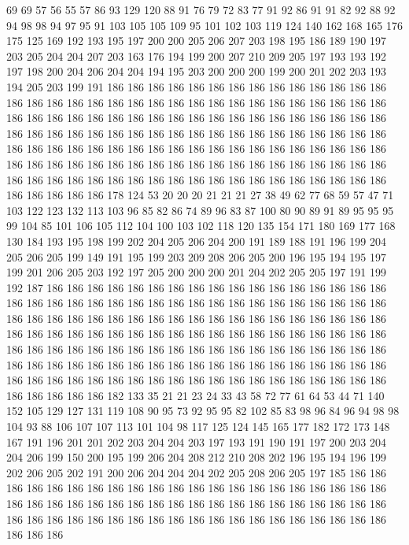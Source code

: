 69 69 57 56 55 57 86 93 129 120 88 91 76 79 72 83 77 91 92 86
91 91 82 92 88 92 94 98 98 94 97 95 91 103 105 105 109 95 101 102
103 119 124 140 162 168 165 176 175 125 169 192 193 195 197 200 200 205 206 207
203 198 195 186 189 190 197 203 205 204 204 207 203 163 176 194 199 200 207 210
209 205 197 193 193 192 197 198 200 204 206 204 204 194 195 203 200 200 200 199
200 201 202 203 193 194 205 203 199 191 186 186 186 186 186 186 186 186 186 186
186 186 186 186 186 186 186 186 186 186 186 186 186 186 186 186 186 186 186 186
186 186 186 186 186 186 186 186 186 186 186 186 186 186 186 186 186 186 186 186
186 186 186 186 186 186 186 186 186 186 186 186 186 186 186 186 186 186 186 186
186 186 186 186 186 186 186 186 186 186 186 186 186 186 186 186 186 186 186 186
186 186 186 186 186 186 186 186 186 186 186 186 186 186 186 186 186 186 186 186
186 186 186 186 186 186 186 186 186 186 186 186 186 186 186 186 186 186 186 186
186 186 186 178 124 53 20 20 20 21 21 21 27 38 49 62 77 68 59 57
47 71 103 122 123 132 113 103 96 85 82 86 74 89 96 83 87 100 80 90
89 91 89 95 95 95 99 104 85 101 106 105 112 104 100 103 102 118 120 135
154 171 180 169 177 168 130 184 193 195 198 199 202 204 205 206 204 200 191 189
188 191 196 199 204 205 206 205 199 149 191 195 199 203 209 208 206 205 200 196
195 194 195 197 199 201 206 205 203 192 197 205 200 200 200 201 204 202 205 205
197 191 199 192 187 186 186 186 186 186 186 186 186 186 186 186 186 186 186 186
186 186 186 186 186 186 186 186 186 186 186 186 186 186 186 186 186 186 186 186
186 186 186 186 186 186 186 186 186 186 186 186 186 186 186 186 186 186 186 186
186 186 186 186 186 186 186 186 186 186 186 186 186 186 186 186 186 186 186 186
186 186 186 186 186 186 186 186 186 186 186 186 186 186 186 186 186 186 186 186
186 186 186 186 186 186 186 186 186 186 186 186 186 186 186 186 186 186 186 186
186 186 186 186 186 186 186 186 186 186 186 186 186 186 186 186 186 186 186 186
186 182 133 35 21 21 23 24 33 43 58 72 77 61 64 53 44 71 140 152
105 129 127 131 119 108 90 95 73 92 95 95 82 102 85 83 98 96 84 96
94 98 98 104 93 88 106 107 107 113 101 104 98 117 125 124 145 165 177 182
172 173 148 167 191 196 201 201 202 203 204 204 203 197 193 191 190 191 197 200
203 204 204 206 199 150 200 195 199 206 204 208 212 210 208 202 196 195 194 196
199 202 206 205 202 191 200 206 204 204 204 202 205 208 206 205 197 185 186 186
186 186 186 186 186 186 186 186 186 186 186 186 186 186 186 186 186 186 186 186
186 186 186 186 186 186 186 186 186 186 186 186 186 186 186 186 186 186 186 186
186 186 186 186 186 186 186 186 186 186 186 186 186 186 186 186 186 186 186 186
